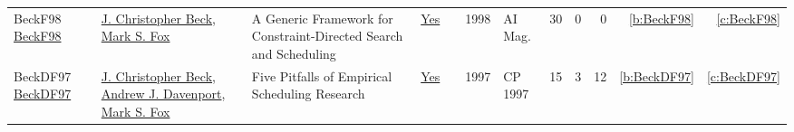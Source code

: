 {\begin{longtable}{>{\raggedright\arraybackslash}p{3cm}>{\raggedright\arraybackslash}p{6cm}>{\raggedright\arraybackslash}p{6.5cm}rrrp{2.5cm}rrrrr}
BeckF98 \href{https://doi.org/10.1609/aimag.v19i4.1426}{BeckF98} & \hyperref[auth:a89]{J. Christopher Beck}, \hyperref[auth:a305]{Mark S. Fox} & A Generic Framework for Constraint-Directed Search and Scheduling & \href{../works/BeckF98.pdf}{Yes} & \cite{BeckF98} & 1998 & {AI} Mag. & 30 & 0 & 0 & \ref{b:BeckF98} & \ref{c:BeckF98}\\
BeckDF97 \href{https://doi.org/10.1007/BFb0017455}{BeckDF97} & \hyperref[auth:a89]{J. Christopher Beck}, \hyperref[auth:a251]{Andrew J. Davenport}, \hyperref[auth:a305]{Mark S. Fox} & Five Pitfalls of Empirical Scheduling Research & \href{../works/BeckDF97.pdf}{Yes} & \cite{BeckDF97} & 1997 & CP 1997 & 15 & 3 & 12 & \ref{b:BeckDF97} & \ref{c:BeckDF97}\\
\end{longtable}
}

\clearpage
